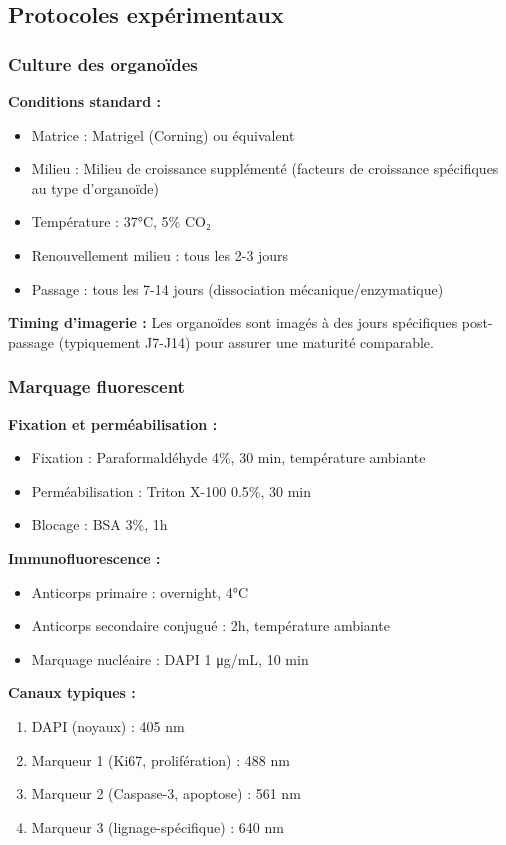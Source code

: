 \subsection{Protocoles expérimentaux}

\subsubsection{Culture des organoïdes}

\textbf{Conditions standard :}
\begin{itemize}
    \item Matrice : Matrigel (Corning) ou équivalent
    \item Milieu : Milieu de croissance supplémenté (facteurs de croissance spécifiques au type d'organoïde)
    \item Température : 37°C, 5\% CO₂
    \item Renouvellement milieu : tous les 2-3 jours
    \item Passage : tous les 7-14 jours (dissociation mécanique/enzymatique)
\end{itemize}

\textbf{Timing d'imagerie :}
Les organoïdes sont imagés à des jours spécifiques post-passage (typiquement J7-J14) pour assurer une maturité comparable.

\subsubsection{Marquage fluorescent}

\textbf{Fixation et perméabilisation :}
\begin{itemize}
    \item Fixation : Paraformaldéhyde 4\%, 30 min, température ambiante
    \item Perméabilisation : Triton X-100 0.5\%, 30 min
    \item Blocage : BSA 3\%, 1h
\end{itemize}

\textbf{Immunofluorescence :}
\begin{itemize}
    \item Anticorps primaire : overnight, 4°C
    \item Anticorps secondaire conjugué : 2h, température ambiante
    \item Marquage nucléaire : DAPI 1 μg/mL, 10 min
\end{itemize}

\textbf{Canaux typiques :}
\begin{enumerate}
    \item DAPI (noyaux) : 405 nm
    \item Marqueur 1 (\eg Ki67, prolifération) : 488 nm
    \item Marqueur 2 (\eg Caspase-3, apoptose) : 561 nm
    \item Marqueur 3 (\eg lignage-spécifique) : 640 nm
\end{enumerate}

